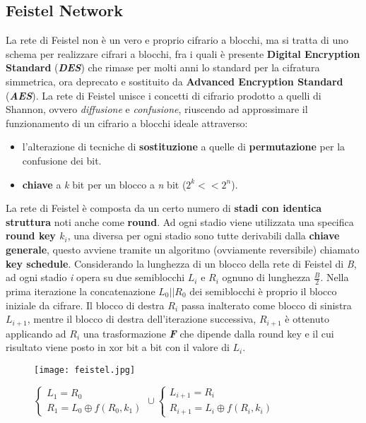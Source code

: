 \subsection{Feistel Network}
La rete di Feistel non è un vero e proprio cifrario a blocchi, ma si tratta di uno schema per realizzare cifrari a blocchi, fra i quali è presente \textbf{Digital Encryption Standard} (\textbf{\textit{DES}}) che rimase per molti anni lo standard per la cifratura simmetrica, ora deprecato e sostituito da \textbf{Advanced Encryption Standard} (\textbf{\textit{AES}}). La rete di Feistel unisce i concetti di cifrario prodotto a quelli di Shannon, ovvero \textit{diffusione} e \textit{confusione}, riuscendo ad approssimare il funzionamento di un cifrario a blocchi ideale attraverso:
\begin{itemize}
    \item l'alterazione di tecniche di \textbf{sostituzione} a quelle di \textbf{permutazione} per la confusione dei bit.
    \item \textbf{chiave} a \textit{k} bit per un blocco a \textit{n} bit ($2^k << 2^n$).
\end{itemize}
La rete di Feistel è composta da un certo numero di \textbf{stadi con identica struttura} noti anche come \textbf{round}. Ad ogni stadio viene utilizzata una specifica \textbf{round key $k_i$}, una diversa per ogni stadio sono tutte derivabili dalla \textbf{chiave generale}, questo avviene tramite un algoritmo (ovviamente reversibile) chiamato \textbf{key schedule}. Considerando la lunghezza di un blocco della rete di Feistel di \textit{B}, ad ogni stadio \textit{i} opera su due semiblocchi $L_i$ e $R_i$ ognuno di lunghezza $\frac{B}{2}$. Nella prima iterazione la concatenazione $L_0 || R_0$ dei semiblocchi è proprio il blocco iniziale da cifrare. Il blocco di destra $R_i$ passa inalterato come blocco di sinistra $L_{i+1}$, mentre il blocco di destra dell'iterazione successiva, $R_{i+1}$ è ottenuto applicando ad $R_i$ una trasformazione \textbf{\textit{F}} che dipende dalla round key e il cui risultato viene posto in xor bit a bit con il valore di $L_i$.

\begin{figure}[h]
    \centering

    \begin{minipage}[t]{0.3\textwidth}
        \centering
        \texttt{[image: feistel.jpg]}
    \end{minipage}
    \hfill
    \begin{minipage}[t]{0.6\textwidth}
        \begin{math}
            \begin{cases}
                L_1 = R_0 \\
                R_1 = L_0 \oplus f(R_0, k_1)
            \end{cases}
            \cup
            \begin{cases}
                L_{i+1} = R_i \\
                R_{i+1} = L_i \oplus f(R_i, k_i)
            \end{cases}
        \end{math}
    \end{minipage}
\end{figure}

